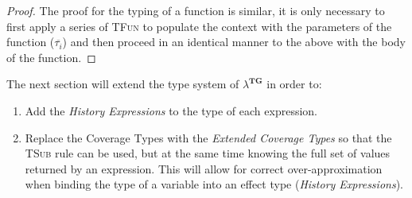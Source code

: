 \begin{proof}
    The proof for the typing of a function is similar, it is only necessary to first apply a series of \textsc{TFun} to populate the context with the parameters of the function ($\overline{\tau_i}$) and then proceed in an identical manner to the above with the body of the function.
\end{proof}

The next section will extend the type system of $\lambda^{\textbf{TG}}$ in order to:
\begin{enumerate}
    \item Add the \emph{History Expressions} to the type of each expression.
    \item Replace the Coverage Types with the \emph{Extended Coverage Types} so that the \textsc{TSub} rule can be used, but at the same time knowing the full set of values returned by an expression. This will allow for correct over-approximation when binding the type of a variable into an effect type (\emph{History Expressions}).
\end{enumerate}